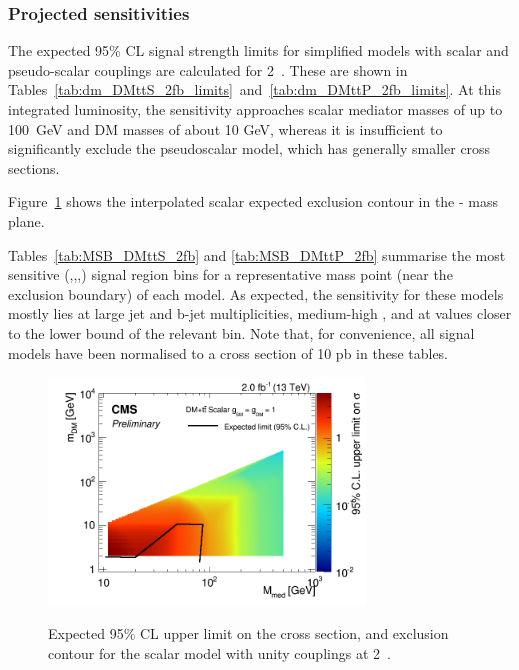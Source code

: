 \clearpage 

 
\clearpage


\subsubsection{Projected sensitivities}

The expected 95\% CL signal strength limits for simplified \DMtt models with scalar and
pseudo-scalar couplings are calculated for 2~\ifb. These are shown in
Tables~\ref{tab:dm_DMttS_2fb_limits}~and~\ref{tab:dm_DMttP_2fb_limits}. At this
integrated luminosity, the sensitivity approaches scalar mediator masses of up 
to 100~GeV and DM masses of about 10 GeV, whereas it is insufficient to
significantly exclude the pseudoscalar model, which has generally smaller cross
sections.

Figure~\ref{fig:dm_DMttS_2fb_2dlimits} shows the interpolated scalar expected 
exclusion contour in the {\mphi-\mchi} mass plane.

Tables~\ref{tab:MSB_DMttS_2fb} and \ref{tab:MSB_DMttP_2fb} summarise the most sensitive 
{(\njet,\nb,\scalht,\mht)} signal region
bins for a representative mass point (near the exclusion boundary) of each \DMtt
model. As expected, the sensitivity for these models mostly lies at large jet and b-jet
multiplicities, medium-high \scalht, and at \mht values closer to the lower bound
of the relevant \scalht bin. Note that, for convenience, all signal models have
been normalised to a cross section of 10 pb in these tables.


\clearpage


\clearpage

\begin{figure}
\begin{center}
\includegraphics[width=0.75\textwidth]{figures/DMplots/dm_DMttS_2p0fb_2dlimits} \\
\caption{Expected 95\% CL upper limit on the cross section, and exclusion
contour for the scalar \DMtt model with unity couplings at 2~\ifb.}
\label{fig:dm_DMttS_2fb_2dlimits}
\end{center}
\end{figure}

